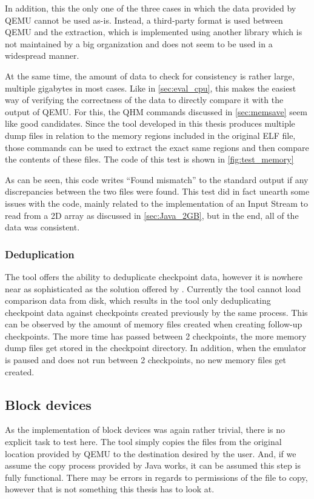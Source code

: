 In addition, this the only one of the three cases
in which the data provided by QEMU cannot be used as-is.
Instead, a third-party format is used between QEMU and the extraction,
which is implemented using another library
which is not maintained by a big organization
and does not seem to be used in a widespread manner.

At the same time, the amount of data to check for consistency is rather large,
multiple gigabytes in most cases.
Like in \autoref{sec:eval_cpu}, this makes the easiest way of verifying the correctness of the data
to directly compare it with the output of QEMU.
For this, the QHM commands discussed in \autoref{sec:memsave} seem like good candidates.
Since the tool developed in this thesis produces multiple dump files
in relation to the memory regions included in the original ELF file,
those commands can be used to extract the exact same regions
and then compare the contents of these files.
The code of this test is shown in \autoref{fig:test_memory}

As can be seen, this code writes \enquote{Found mismatch} to the standard output
if any discrepancies between the two files were found.
This test did in fact unearth some issues with the code,
mainly related to the implementation of an Input Stream to read from a 2D array
as discussed in \autoref{sec:Java_2GB},
but in the end, all of the data was consistent.

\subsubsection*{Deduplication}
The tool offers the ability to deduplicate checkpoint data,
however it is nowhere near as sophisticated as the solution offered by \citeauthor{kitcheckpoints}.
Currently the tool cannot load comparison data from disk,
which results in the tool only deduplicating checkpoint data
against checkpoints created previously by the same process.
This can be observed by the amount of memory files created
when creating follow-up checkpoints.
The more time has passed between 2 checkpoints,
the more memory dump files get stored in the checkpoint directory.
In addition, when the emulator is paused and does not run between 2 checkpoints, no new memory files get created.

\subsection{Block devices}
As the implementation of block devices was again rather trivial,
there is no explicit task to test here.
The tool simply copies the files from the original location provided by QEMU
to the destination desired by the user.
And, if we assume the copy process provided by Java works,
it can be assumed this step is fully functional.
There may be errors in regards to permissions of the file to copy,
however that is not something this thesis has to look at.

